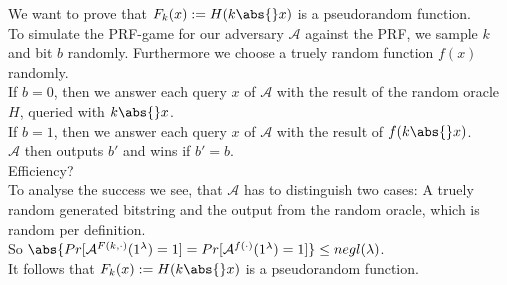 We want to prove that \(F_k(x) := H (k \abs{} x)\) is a pseudorandom function.\\
To simulate the PRF-game for our adversary \(\mathcal{A}\) against the PRF, we sample \(k\) and bit \(b\) randomly. Furthermore we choose a truely random function \(f(x)\) randomly. \\
If \(b= 0\), then we answer each query \(x\) of \(\mathcal{A}\) with the result of the random oracle \(H\), queried with \(k \abs{} x\).\\
If \(b= 1\), then we answer each query \(x\) of \(\mathcal{A}\) with the result of \(f(k \abs{} x)\).\\
\(\mathcal{A}\) then outputs \(b'\) and wins if \(b' = b\).\\
Efficiency?\\
To analyse the success we see, that \(\mathcal{A}\) has to distinguish two cases: A truely random generated bitstring and the output from the random oracle, which is random per definition. \\
So \(\abs{Pr[\mathcal{A}^{F(k,\cdot)}(1^{\lambda})= 1]= Pr[\mathcal{A}^{f(\cdot)}(1^{\lambda})= 1]} \le negl(\lambda)\).\\
It follows that \(F_k(x) := H (k \abs{} x)\) is a pseudorandom function.



 